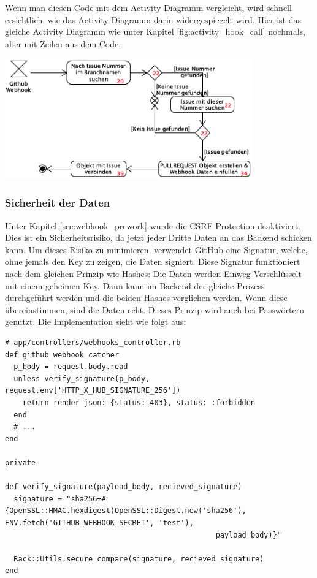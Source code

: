 Wenn man diesen Code mit dem Activity Diagramm vergleicht, wird schnell ersichtlich, wie das Activity Diagramm darin
widergespiegelt wird. Hier ist das gleiche Activity Diagramm wie unter Kapitel \ref{fig:activity_hook_call} nochmals,
aber mit Zeilen aus dem Code.
\begin{center}
  \includegraphics[width=0.8\textwidth]{images/activity/pr_webhook_lines.png}
  \label{fig:activity_diagram_pr_webhook_lines}
\end{center}

\subsubsection{Sicherheit der Daten}
Unter Kapitel \ref{sec:webhook_prework} wurde die CSRF Protection deaktiviert. Dies ist ein Sicherheitsrisiko, da
jetzt jeder Dritte Daten an das Backend schicken kann. Um dieses Risiko zu minimieren, verwendet GitHub eine Signatur,
welche, ohne jemals den Key zu zeigen, die Daten signiert. Diese Signatur funktioniert nach dem gleichen Prinzip wie
Hashes: Die Daten werden Einweg-Verschlüsselt mit einem geheimen Key. Dann kann im Backend der gleiche Prozess 
durchgeführt werden und die beiden Hashes verglichen werden. Wenn diese übereinstimmen, sind die Daten echt. Dieses
Prinzip wird auch bei Passwörtern genutzt. \cite{password_storage} \newline
Die Implementation sieht wie folgt aus:
\begin{codebox}[]
  \begin{verbatim}
# app/controllers/webhooks_controller.rb
def github_webhook_catcher
  p_body = request.body.read
  unless verify_signature(p_body, request.env['HTTP_X_HUB_SIGNATURE_256'])
    return render json: {status: 403}, status: :forbidden
  end
  # ...
end

private

def verify_signature(payload_body, recieved_signature)
  signature = "sha256=#{OpenSSL::HMAC.hexdigest(OpenSSL::Digest.new('sha256'), ENV.fetch('GITHUB_WEBHOOK_SECRET', 'test'),
                                                payload_body)}"

  Rack::Utils.secure_compare(signature, recieved_signature)
end
  \end{verbatim}
\end{codebox}

